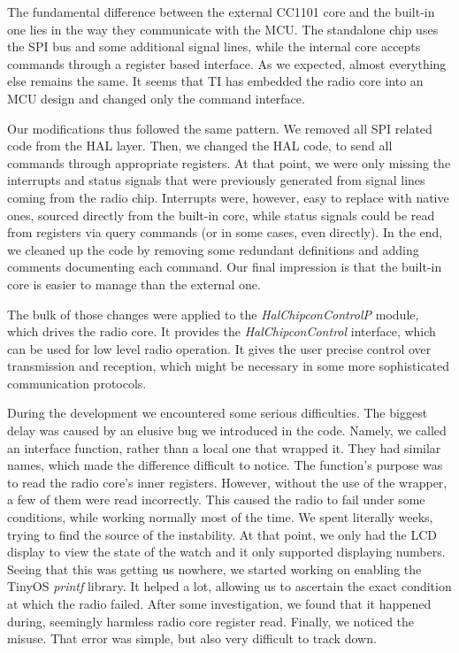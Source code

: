 The fundamental difference between the external CC1101 core and the built-in one lies in the way they communicate with the MCU. The standalone chip uses the SPI bus and some additional signal lines, while the internal core accepts commands through a register based interface. As we expected, almost everything else remains the same. It seems that TI has embedded the radio core into an MCU design and changed only the command interface.

Our modifications thus followed the same pattern. We removed all SPI related code from the HAL layer. Then, we changed the HAL code, to send all commands through appropriate registers. At that point, we were only missing the interrupts and status signals that were previously generated from signal lines coming from the radio chip. Interrupts were, however, easy to replace with native ones, sourced directly from the built-in core, while status signals could be read from registers via query commands (or in some cases, even directly). In the end, we cleaned up the code by removing some redundant definitions and adding comments documenting each command. Our final impression is that the built-in core is easier to manage than the external one.

The bulk of those changes were applied to the \emph{HalChipconControlP} module, which drives the radio core. It provides the \emph{HalChipconControl} interface, which can be used for low level radio operation. It gives the user precise control over transmission and reception, which might be necessary in some more sophisticated communication protocols.

During the development we encountered some serious difficulties. The biggest delay was caused by an elusive bug we introduced in the code. Namely, we called an interface function, rather than a local one that wrapped it. They had similar names, which made the difference difficult to notice. The function's purpose was to read the radio core's inner registers. However, without the use of the wrapper, a few of them were read incorrectly. This caused the radio to fail under some conditions, while working normally most of the time. We spent literally weeks, trying to find the source of the instability. At that point, we only had the LCD display to view the state of the watch and it only supported displaying numbers. Seeing that this was getting us nowhere, we started working on enabling the TinyOS \emph{printf} library. It helped a lot, allowing us to ascertain the exact condition at which the radio failed. After some investigation, we found that it happened during, seemingly harmless radio core register read. Finally, we noticed the misuse. That error was simple, but also very difficult to track down.

